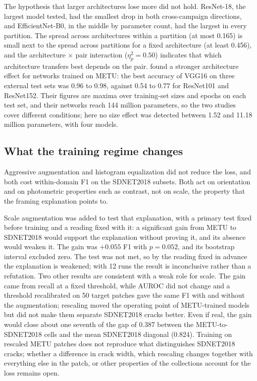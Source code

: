 \documentclass[pdflatex,sn-apa]{sn-jnl}
\begin{document}
The hypothesis that larger architectures lose more did not hold. ResNet-18, the largest model tested, had the smallest drop in both cross-campaign directions, and EfficientNet-B0, in the middle by parameter count, had the largest in every partition. The spread across architectures within a partition (at most 0.165) is small next to the spread across partitions for a fixed architecture (at least 0.456), and the architecture $\times$ pair interaction ($\eta^2_p=0.50$) indicates that which architecture transfers best depends on the pair. \citet{ozgenel2018} found a stronger architecture effect for networks trained on METU: the best accuracy of VGG16 on three external test sets was 0.96 to 0.98, against 0.54 to 0.77 for ResNet101 and ResNet152. Their figures are maxima over training-set sizes and epochs on each test set, and their networks reach 144 million parameters, so the two studies cover different conditions; here no size effect was detected between 1.52 and 11.18 million parameters, with four models.

\subsection{What the training regime changes}\label{sec:disc-regime}

Aggressive augmentation and histogram equalization did not reduce the loss, and both cost within-domain F1 on the SDNET2018 subsets. Both act on orientation and on photometric properties such as contrast, not on scale, the property that the framing explanation points to.

Scale augmentation was added to test that explanation, with a primary test fixed before training and a reading fixed with it: a significant gain from METU to SDNET2018 would support the explanation without proving it, and its absence would weaken it. The gain was $+0.055$ F1 with $p=0.052$, and its bootstrap interval excluded zero. The test was not met, so by the reading fixed in advance the explanation is weakened; with 12 runs the result is inconclusive rather than a refutation. Two other results are consistent with a weak role for scale. The gain came from recall at a fixed threshold, while AUROC did not change and a threshold recalibrated on 50 target patches gave the same F1 with and without the augmentation; rescaling moved the operating point of METU-trained models but did not make them separate SDNET2018 cracks better. Even if real, the gain would close about one seventh of the gap of 0.387 between the METU-to-SDNET2018 cells and the mean SDNET2018 diagonal (0.824). Training on rescaled METU patches does not reproduce what distinguishes SDNET2018 cracks; whether a difference in crack width, which rescaling changes together with everything else in the patch, or other properties of the collections account for the loss remains open.
\end{document}
